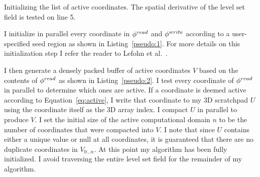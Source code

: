 \begin{Listing}[t]
    \caption{Initializing the list of active coordinates. The spatial derivative of the level set field is tested on line 5. \label{pseudo:2} }
    \begin{algorithmic}[1]
                    \IF { $ \phiread_{\boldx} \neq \phiread_{\boldn} $  }
                    \ENDIF    
                \ENDIF
            \ENDFOR
            \ENDIF           
        \ENDFOR
    \end{algorithmic}
\end{Listing}


I initialize in parallel every coordinate in $\phi^{read}$ and $\phi^{write}$ according to a user-specified seed region as shown in Listing~\ref{pseudo:1}. For more details on this initialization step I refer the reader to Lefohn et al.~\cite{Lefohn-2004}.

I then generate a densely packed buffer of active coordinates $V$ based on the contents of $\phi^{read}$ as shown in Listing~\ref{pseudo:2}. I test every coordinate of $\phi^{read}$ in parallel to determine which ones are active. If a coordinate is deemed active according to Equation~\ref{eq:active}, I write that coordinate to my 3D scratchpad $U$ using the coordinate itself as the 3D array index. I compact $U$ in parallel to produce $V$. I set the initial size of the active computational domain $n$ to be the number of coordinates that were compacted into $V$. I note that since $U$ contains either a unique value or null at all coordinates, it is guaranteed that there are no duplicate coordinates in $V_{0 \ldots n}$. At this point my algorithm has been fully initialized. I avoid traversing the entire level set field for the remainder of my algorithm.




